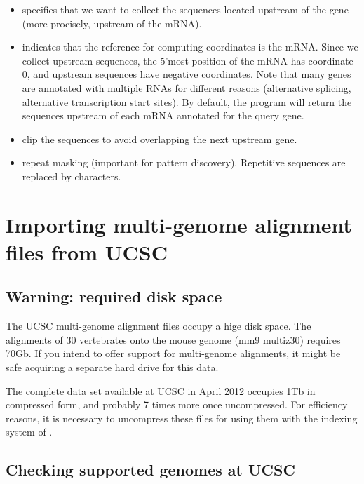 \begin{itemize}

\item {} specifies that we want to collect the
  sequences located upstream of the gene (more procisely, upstream of
  the mRNA).

\item {} indicates that the reference for computing
  coordinates is the mRNA. Since we collect upstream sequences, the
  5'most position of the mRNA has coordinate 0, and upstream sequences
  have negative coordinates. Note that many genes are annotated with
  multiple RNAs for different reasons (alternative splicing,
  alternative transcription start sites). By default, the program will
  return the sequences upstream of each mRNA annotated for the query
  gene.

\item {} clip the sequences to avoid overlapping the next
  upstream gene.

\item {} repeat masking (important for pattern
  discovery). Repetitive sequences are replaced by  characters.

\end{itemize} 

\section{Importing multi-genome alignment files from UCSC}

\subsection{Warning: required disk space}

The UCSC multi-genome alignment files occupy a hige disk space. The
alignments of 30 vertebrates onto the mouse genome (mm9 multiz30)
requires 70Gb. If you intend to offer support for multi-genome
alignments, it might be safe acquiring a separate hard drive for this
data.

The complete data set available at UCSC in April 2012 occupies 1Tb in
compressed form, and probably 7 times more once uncompressed. For
efficiency reasons, it is necessary to uncompress these files for
using them with the indexing system of  .

\subsection{Checking supported genomes at UCSC}

